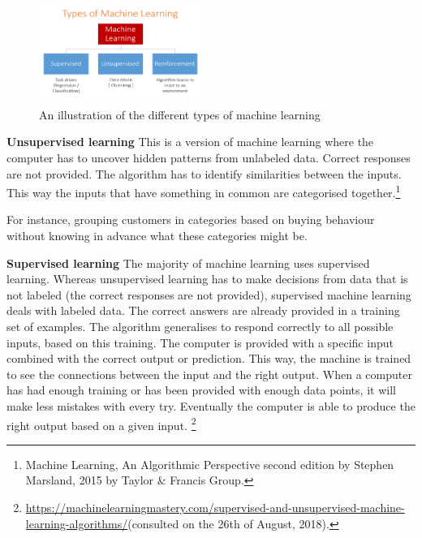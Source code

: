 \documentclass[11pt]{article}
\begin{document}
\begin{figure}[htbp]
\centering
\includegraphics[width=200]{./typesmachinelearning.png}
\caption{\label{tab:types}
An illustration of the different types of machine learning}
\end{figure}


\textbf{Unsupervised learning}
This is a version of machine learning where the computer has to uncover hidden patterns from unlabeled data. Correct responses are not provided. The algorithm has to identify similarities between the inputs. This way the inputs that have something in common are categorised together.\footnote{Machine Learning, An Algorithmic Perspective second edition by Stephen Marsland, 2015 by Taylor \& Francis Group.}

For instance, grouping customers in categories based on buying behaviour without knowing in advance what these categories might be. 

\textbf{Supervised learning}
The majority of machine learning uses supervised learning. Whereas unsupervised learning has to make decisions from data that is not labeled (the correct responses are not provided), supervised machine learning deals with labeled data. The correct answers are already provided in a training set of examples. The algorithm generalises to respond correctly to all possible inputs, based on this training. The computer is provided with a specific input combined with the correct output or prediction. This way, the machine is trained to see the connections between the input and the right output. When a computer has had enough training or has been provided with enough data points, it will make less mistakes with every try. Eventually the computer is able to produce the right output based on a given input. \footnote{\url{https://machinelearningmastery.com/supervised-and-unsupervised-machine-learning-algorithms/}(consulted on the 26th of August, 2018).}
\end{document}
